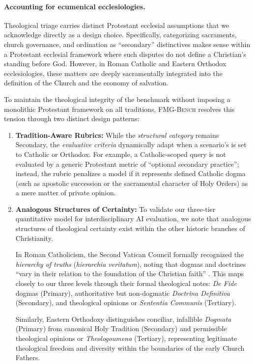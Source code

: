 \documentclass[11pt]{article}
\newcommand{\fmgb}{\textsc{FMG-Bench}}
\newcommand{\tagcode}[1]{\path{#1}}
\begin{document}
\paragraph{Accounting for ecumenical ecclesiologies.}

Theological triage carries distinct Protestant ecclesial assumptions that we acknowledge directly as a design choice. Specifically, categorizing sacraments, church governance, and ordination as ``secondary'' distinctives makes sense within a Protestant ecclesial framework where such disputes do not define a Christian's standing before God. However, in Roman Catholic and Eastern Orthodox ecclesiologies, these matters are deeply sacramentally integrated into the definition of the Church and the economy of salvation. 

To maintain the theological integrity of the benchmark without imposing a monolithic Protestant framework on all traditions, \fmgb{} resolves this tension through two distinct design patterns:

\begin{enumerate}[leftmargin=*]
    \item \textbf{Tradition-Aware Rubrics:} While the \emph{structural category} remains Secondary, the \emph{evaluative criteria} dynamically adapt when a scenario's \tagcode{tradition_scope} is set to Catholic or Orthodox. For example, a Catholic-scoped query is not evaluated by a generic Protestant metric of ``optional secondary practice''; instead, the rubric penalizes a model if it represents defined Catholic dogma (such as apostolic succession or the sacramental character of Holy Orders) as a mere matter of private opinion.
    \item \textbf{Analogous Structures of Certainty:} To validate our three-tier quantitative model for interdisciplinary AI evaluation, we note that analogous structures of theological certainty exist within the other historic branches of Christianity. 
    
    In Roman Catholicism, the Second Vatican Council formally recognized the \emph{hierarchy of truths} (\emph{hierarchia veritatum}), noting that dogmas and doctrines ``vary in their relation to the foundation of the Christian faith'' \cite{vaticanII_ur11}. This maps closely to our three levels through their formal theological notes: \emph{De Fide} dogmas (Primary), authoritative but non-dogmatic \emph{Doctrina Definitiva} (Secondary), and theological opinions or \emph{Sententia Communis} (Tertiary). 
    
    Similarly, Eastern Orthodoxy distinguishes conciliar, infallible \emph{Dogmata} (Primary) from canonical Holy Tradition (Secondary) and permissible theological opinions or \emph{Theologoumena} (Tertiary), representing legitimate theological freedom and diversity within the boundaries of the early Church Fathers.
\end{enumerate}
\end{document}
